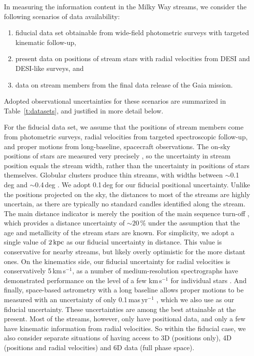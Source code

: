 \documentclass[modern]{aastex62}
\begin{document}
In measuring the information content in the Milky Way streams, we consider the following scenarios of data availability:
\begin{enumerate}
\item fiducial data set obtainable from wide-field photometric surveys with targeted kinematic follow-up,
\item present data on positions of stream stars with radial velocities from DESI and DESI-like surveys, and
\item data on stream members from the final data release of the Gaia mission.
\end{enumerate}
Adopted observational uncertainties for these scenarios are summarized in Table~\ref{t:datasets}, and justified in more detail below.

For the fiducial data set, we assume that the positions of stream members come from photometric surveys, radial velocities from targeted spectroscopic follow-up, and proper motions from long-baseline, spacecraft observations.
The on-sky positions of stars are measured very precisely \citep[for example, better than 100\,mas in SDSS,][]{pier2003}, so the uncertainty in stream position equals the stream width, rather than the uncertainty in positions of stars themselves.
Globular clusters produce thin streams, with widths between $\sim$0.1\,deg \citep[e.g., PS1A,][]{bernard2016} and $\sim$0.4\,deg \citep[e.g., Sangarius,][]{grillmair2017a}.
We adopt 0.1\,deg for our fiducial positional uncertainty.
Unlike the positions projected on the sky, the distances to most of the streams are highly uncertain, as there are typically no standard candles identified along the stream.
The main distance indicator is merely the position of the main sequence turn-off \citep[e.g.,][]{bonaca2012}, which provides a distance uncertainty of $\sim20\,\%$ under the assumption that the age and metallicity of the stream stars are known.
For simplicity, we adopt a single value of $2\,\rm kpc$ as our fiducial uncertainty in distance.
This value is conservative for nearby streams, but likely overly optimistic for the more distant ones.
On the kinematics side, our fiducial uncertainty for radial velocities is conservatively 5\,km\,s$^{-1}$, as a number of medium-resolution spectrographs have demonstrated performance on the level of a few km\,s$^{-1}$ for individual stars \citep[e.g.,][]{sg}.
And finally, space-based astrometry with a long baseline allows proper motions to be measured with an uncertainty of only 0.1\,mas\,yr$^{-1}$ \citep{sohn2015}, which we also use as our fiducial uncertainty.
These uncertainties are among the best attainable at the present.
Most of the streams, however, only have positional data, and only a few have kinematic information from radial velocities.
So within the fiducial case, we also consider separate situations of having access to 3D (positions only), 4D (positions and radial velocities) and 6D data (full phase space).
\end{document}
